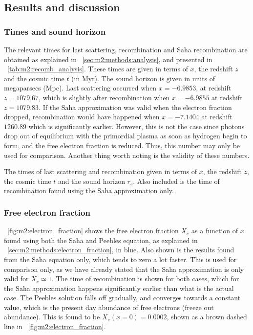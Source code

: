 \subsection{Results and discussion}\label{sec:m2:results} 

    \subsubsection{Times and sound horizon}
    The relevant times for last scattering, recombination and Saha recombination are obtained as explained in ~\cref{sec:m2:methods:analysis}, and presented in ~\cref{tab:m2:recomb_analysis}. These times are given in terms of $x$, the redshift $z$ and the cosmic time $t$ (in Myr). The sound horizon is given in units of megaparsecs (Mpc). Last scattering occurred when $x=-6.9853$, at redshift $z=1079.67$, which is slightly after recombination when $x=-6.9855$ at redshift $z=1079.83$. If the Saha approximation was valid when the electron fraction dropped, recombination would have happened when $x=-7.1404$ at redshift $1260.89$ which is significantly earlier. However, this is not the case since photons drop out of equilibrium with the primordial plasma as soon as hydrogen begin to form, and the free electron fraction is reduced. Thus, this number may only be used for comparison. Another thing worth noting is the validity of these numbers.
    \begin{table}
        \label{tab:m2:recomb_analysis}
        
        \caption{The times of last scattering and recombination given in terms of $x$, the redshift $z$, the cosmic time $t$ and the sound horizon $r_s$. Also included is the time of recombination found using the Saha approximation only.}
    \end{table}

    \subsubsection{Free electron fraction}
    ~\cref{fig:m2:electron_fraction} shows the free electron fraction $X_e$ as a function of $x$ found using both the Saha and Peebles equation, as explained in ~\cref{sec:m2:methods:electron_fraction}, in blue. Also shown is the results found from the Saha equation only, which tends to zero a lot faster. This is used for comparison only, as we have already stated that the Saha approximation is only valid for $X_e\simeq 1$. The time of recombination is shown for both cases, which for the Saha approximation happens significantly earlier than what is the actual case. The Peebles solution falls off gradually, and converges towards a constant value, which is the present day abundance of free electrons (freeze out abundance). This is found to be $X_e(x=0) = 0.0002$, shown as a brown dashed line in ~\cref{fig:m2:electron_fraction}.

